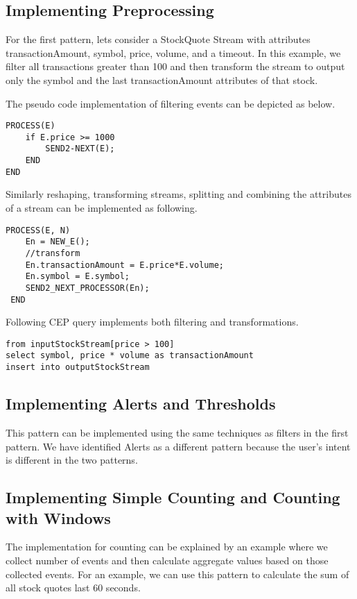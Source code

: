 \documentclass{sig-alternate}
\begin{document}
{\subsection{Implementing Preprocessing}

For the first pattern, lets consider a StockQuote Stream with attributes transactionAmount, symbol, price, volume, and a timeout. In this example, we filter all transactions greater than 100 and then transform the stream to output only the symbol and the last transactionAmount attributes of that stock. 

The pseudo code implementation of filtering events can be depicted as below. 


\begin{lstlisting}[mathescape, showstringspaces=false]
PROCESS(E) 
	if E.price >= 1000
		SEND2-NEXT(E); 
	END
END
\end{lstlisting}


Similarly reshaping, transforming streams, splitting and combining the attributes of a stream can be implemented as following.

\begin{lstlisting}[mathescape, showstringspaces=false]
PROCESS(E, N) 
	En = NEW_E(); 
	//transform
	En.transactionAmount = E.price*E.volume;
	En.symbol = E.symbol;
	SEND2_NEXT_PROCESSOR(En); 
 END
\end{lstlisting}


Following CEP query implements both filtering and transformations. 

\begin{lstlisting}[mathescape, showstringspaces=false]
from inputStockStream[price > 100]
select symbol, price * volume as transactionAmount
insert into outputStockStream 
\end{lstlisting}



\subsection{Implementing Alerts and Thresholds}
This pattern can be implemented using the same techniques as filters in the first pattern. We have identified Alerts as a different pattern because the user's intent is different in the two patterns. 


\subsection{Implementing Simple Counting and Counting with Windows}
The implementation for counting can be explained by an example where we collect number of events and then calculate aggregate values based on those collected events. For an example, we can use this pattern to calculate the sum of all stock quotes last 60 seconds. 

}
\end{document}
